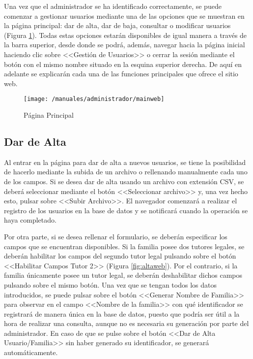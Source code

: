 Una vez que el administrador se ha identificado correctamente, se puede comenzar a gestionar usuarios mediante una de las opciones que se muestran en la página principal: dar de alta, dar de baja, consultar o modificar usuarios (Figura \ref{fig:indexweb}). Todas estas opciones estarán disponibles de igual manera a través de la barra superior, desde donde se podrá, además, navegar hacia la página inicial haciendo clic sobre <<Gestión de Usuarios>> o cerrar la sesión mediante el botón con el mismo nombre situado en la esquina superior derecha. De aquí en adelante se explicarán cada una de las funciones principales que ofrece el sitio web.

\begin{figure}[!h]
	\begin{center}
		\texttt{[image: /manuales/administrador/mainweb]}
		\caption{Página Principal}
		\label{fig:indexweb}
	\end{center}
\end{figure}

\clearpage

\subsection*{Dar de Alta}
Al entrar en la página para dar de alta a nuevos usuarios, se tiene la posibilidad de hacerlo mediante la subida de un archivo o rellenando manualmente cada uno de los campos. Si se desea dar de alta usando un archivo con extensión \acs{CSV}, se deberá seleccionar mediante el botón <<Seleccionar archivo>> y, una vez hecho esto, pulsar sobre <<Subir Archivo>>. El navegador comenzará a realizar el registro de los usuarios en la base de datos y se notificará cuando la operación se haya completado.

Por otra parte, si se desea rellenar el formulario, se deberán especificar los campos que se encuentran disponibles. Si la familia posee dos tutores legales, se deberán habilitar los campos del segundo tutor legal pulsando sobre el botón <<Habilitar Campos Tutor 2>> (Figura \ref{fig:altaweb}). Por el contrario, si la familia únicamente posee un tutor legal, se deberán deshabilitar dichos campos pulsando sobre el mismo botón. Una vez que se tengan todos los datos introducidos, se puede pulsar sobre el botón <<Generar Nombre de Familia>> para observar en el campo <<Nombre de la familia>> con qué identificador se registrará de manera única en la base de datos, puesto que podría ser útil a la hora de realizar una consulta, aunque no es necesaria su generación por parte del administrador. En caso de que se pulse sobre el botón <<Dar de Alta Usuario/Familia>> sin haber generado su identificador, se generará automáticamente.

